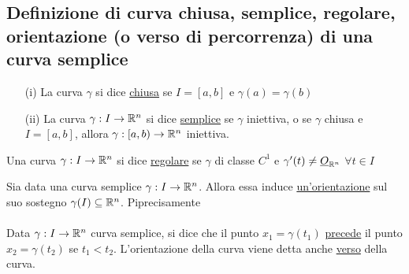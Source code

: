 \subsection{Definizione di curva chiusa, semplice, regolare, orientazione (o
verso di percorrenza) di una curva semplice}
\begin{definition}
  \begin{itemize}
    \item[(i)] La curva $\gamma$ si dice \underline{chiusa} se $I = [a,b]$ e $\gamma(a) = \gamma(b)$
    \item[(ii)] La curva $\gamma:I\to\mathbb{R}^n$ si dice \underline{semplice} se $\gamma$ \ace iniettiva, o 
                se $\gamma$ \ace chiusa e $I = [a,b]$, allora $\gamma :[a,b) \to \mathbb{R}^n$ \ace iniettiva.
  \end{itemize}
\end{definition}
\begin{definition}
  Una curva $\gamma:I\to\mathbb{R}^n$ si dice \underline{regolare} se $\gamma$ 
  \ace di classe $C^1$ e $\gamma'(t) \neq \underline{O}_{\mathbb{R}^n}$ $\forall t \in I$ 
\end{definition}
\begin{definition}
  Sia data una curva semplice $\gamma:I\to\mathbb{R}^n$. Allora 
  essa induce \underline{un'orientazione} sul suo sostegno $\gamma(I) \subseteq \mathbb{R}^n$.
  Pi\acu precisamente \\\\
  Data $\gamma:I\to\mathbb{R}^n$ curva semplice, si dice che il punto $x_1 = \gamma(t_1)$ \underline{precede}
  il punto $x_2 = \gamma(t_2)$ se $t_1 < t_2$. L'orientazione della curva viene detta
  anche \underline{verso} della curva.
\end{definition}